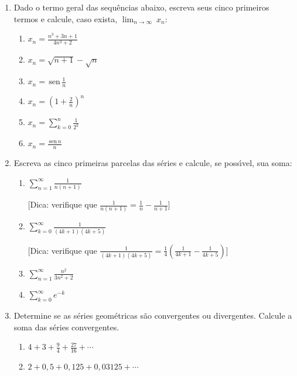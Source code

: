 \documentclass[a4paper,5pt]{amsbook}
\renewcommand{\sin}{\,\mbox{sen}\,}
\newcommand{\ds}{\displaystyle}
\begin{document}
\vspace{1cm}
\begin{enumerate}
    \vspace{0.5cm}
    \item Dado o termo geral das sequ\^encias abaixo, escreva seus cinco
    primeiros termos e calcule, caso exista,
    $\displaystyle\lim_{n\rightarrow\infty}\ x_n$:
        \begin{enumerate}
        \setlength\itemsep{0.2cm}
        \item $x_n = \ds\frac{n^3+3n+1}{4n^3+2}$
        \item $x_n = \sqrt{n+1}-\sqrt{n}$
        \item $x_n = \ds\sin\frac{1}{n}$
        \item $x_n = \ds{\left(1+\frac{2}{n}\right)}^n$
        \item $x_n = \ds\sum_{k=0}^n \frac{1}{2^k}$
        \item $x_n = \ds\frac{\sin n}{n}$
        \end{enumerate}

    \setlength\itemsep{0.5cm}
    \item Escreva as cinco primeiras parcelas das s\'eries e calcule, se
    poss\'{\i}vel, sua soma:
    	\begin{enumerate}
            \setlength\itemsep{0.3cm}
    		\item $\ds\sum_{n=1}^\infty\ds\frac{1}{n(n+1)}$
    
                [Dica: verifique que
                $\frac{1}{n(n+1)}=\frac{1}{n}-\frac{1}{n+1}$]
    		\item $\ds\sum_{k=0}^\infty \ds\frac{1}{(4k+1)(4k+5)}$
    
                [Dica: verifique que $\frac{1}{(4k+1)(4k+5)} =
                \frac{1}{4}\left(\frac{1}{4k+1} - \frac{1}{4k+5}\right)$]
    		\item $\ds\sum_{n=1}^\infty\ds\frac{n^2}{3n^2+2}$
    		\item $\ds\sum_{k=0}^\infty e^{-k}$
    	\end{enumerate}
    
    \item Determine se as s\'eries geom\'etricas s\~ao convergentes ou divergentes.
    Calcule a soma das s\'eries convergentes.
    	\begin{enumerate}
            \setlength\itemsep{0.3cm}
    		\item $\ds4+3+\frac{9}{4}+\frac{27}{16}+\cdots$
    		\item $\ds2+0,5+0,125+0,03125+\cdots$
    	\end{enumerate}
    

\end{enumerate}
\end{document}
